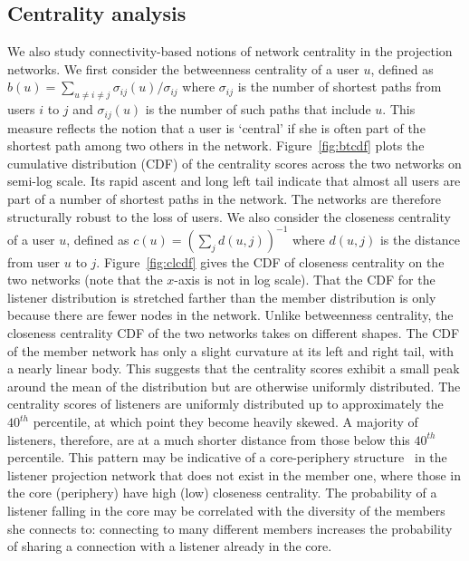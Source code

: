 \subsection{Centrality analysis}
We also study connectivity-based notions of network centrality in the 
projection networks. We first consider the betweenness centrality
of a user $u$, defined as 
$b(u) = \sum_{u\neq i \neq j} \sigma_{ij}(u) / \sigma_{ij}$ where 
$\sigma_{ij}$ is the number of shortest paths from users $i$ to $j$ and
$\sigma_{ij}(u)$ is the number of such paths that include $u$. 
This measure reflects the notion that a user is `central' if she is often part of the 
shortest path among two others in the network. Figure~\ref{fig:btcdf}
plots the cumulative distribution (CDF) of the centrality scores across the 
two networks on semi-log scale. Its rapid ascent and long left tail
indicate that almost all users are part of a number of shortest paths in the network. 
The networks are therefore structurally robust to the loss of users. 
We also consider the closeness centrality of a user $u$,
defined as $c(u) = (\sum_{j} d(u,j))^{-1}$ where $d(u,j)$ is the distance
from user $u$ to $j$. Figure~\ref{fig:clcdf} gives the CDF of closeness centrality
on the two networks (note that the $x$-axis is not in log scale). That the
CDF for the listener distribution is stretched farther than the 
member distribution is only because there are fewer nodes in the network.
Unlike betweenness centrality, the closeness centrality CDF 
of the two networks takes on different shapes. 
The CDF of the member network has only a slight
curvature at its left and right tail, with a nearly linear body. This suggests
that the centrality scores exhibit a small peak around
the mean of the distribution but are otherwise uniformly distributed.
The centrality scores of listeners are uniformly distributed up to 
approximately the $40^{th}$ percentile, at which point they become
heavily skewed. A majority of listeners, therefore, 
are at a much shorter distance from those below this $40^{th}$ percentile.
This pattern may be indicative of a core-periphery structure~\cite{rombach2014core}
in the listener projection network that does not exist in the member one, 
where those in the core (periphery) have high (low) closeness centrality. 
The probability of a listener falling in the core may be correlated with the 
diversity of the members she connects to: connecting to many different
members increases the probability of sharing a connection with a listener
already in the core. 

